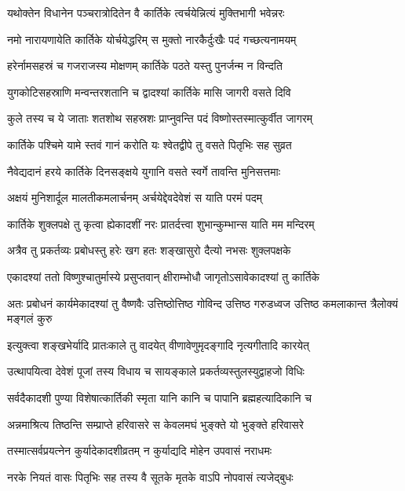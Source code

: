 \twolineshloka
{यथोक्तेन विधानेन पञ्चरात्रोदितेन वै}
{कार्तिके त्वर्चयेन्नित्यं मुक्तिभागी भवेन्नरः} %

\twolineshloka
{नमो नारायणायेति कार्तिके योर्चयेद्धरिम्}
{स मुक्तो नारकैर्दुःखैः पदं गच्छत्यनामयम्} %

\twolineshloka
{हरेर्नामसहस्रं च गजराजस्य मोक्षणम्}
{कार्तिके पठते यस्तु पुनर्जन्म न विन्दति} %

\twolineshloka
{युगकोटिसहस्राणि मन्वन्तरशतानि च}
{द्वादश्यां कार्तिके मासि जागरी वसते दिवि} %

\twolineshloka
{कुले तस्य च ये जाताः शतशोथ सहस्रशः}
{प्राप्नुवन्ति पदं विष्णोस्तस्मात्कुर्वीत जागरम्} %

\twolineshloka
{कार्तिके पश्चिमे यामे स्तवं गानं करोति यः}
{श्वेतद्वीपे तु वसते पितृभिः सह सुव्रत} %

\twolineshloka
{नैवेद्यदानं हरये कार्तिके दिनसङ्क्षये}
{युगानि वसते स्वर्गे तावन्ति मुनिसत्तमाः} %

\twolineshloka
{अक्षयं मुनिशार्दूल मालतीकमलार्चनम्}
{अर्चयेद्देवदेवेशं स याति परमं पदम्} %

\twolineshloka
{कार्तिके शुक्लपक्षे तु कृत्वा ह्येकादशीं नरः}
{प्रातर्दत्त्वा शुभान्कुम्भान्स याति मम मन्दिरम्} %

\twolineshloka
{अत्रैव तु प्रकर्तव्यः प्रबोधस्तु हरेः खग}
{हतः शङ्खासुरो दैत्यो नभसः शुक्लपक्षके} %

\twolineshloka
{एकादश्यां ततो विष्णुश्चातुर्मास्ये प्रसुप्तवान्}
{क्षीराम्भोधौ जागृतोऽसावेकादश्यां तु कार्तिके} %

\threelineshloka
{अतः प्रबोधनं कार्यमेकादश्यां तु वैष्णवैः}
{उत्तिष्ठोत्तिष्ठ गोविन्द उत्तिष्ठ गरुडध्वज}
{उत्तिष्ठ कमलाकान्त त्रैलोक्यं मङ्गलं कुरु} %

\twolineshloka
{इत्युक्त्वा शङ्खभेर्यादि प्रातःकाले तु वादयेत्}
{वीणावेणुमृदङ्गादि नृत्यगीतादि कारयेत्} %

\twolineshloka
{उत्थापयित्वा देवेशं पूजां तस्य विधाय च}
{सायङ्काले प्रकर्तव्यस्तुलस्युद्वाहजो विधिः} %

\twolineshloka
{सर्वदैकादशी पुण्या विशेषात्कार्तिकी स्मृता}
{यानि कानि च पापानि ब्रह्महत्यादिकानि च} %

\twolineshloka
{अन्नमाश्रित्य तिष्ठन्ति सम्प्राप्ते हरिवासरे}
{स केवलमघं भुङ्क्ते यो भुङ्क्ते हरिवासरे} %

\twolineshloka
{तस्मात्सर्वप्रयत्नेन कुर्यादेकादशीव्रतम्}
{न कुर्याद्यदि मोहेन उपवासं नराधमः} %

\twolineshloka
{नरके नियतं वासः पितृभिः सह तस्य वै}
{सूतके मृतके वाऽपि नोपवासं त्यजेद्बुधः} %

